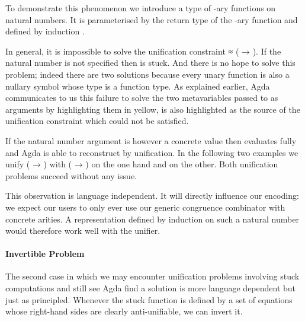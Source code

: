 To demonstrate this phenomenon we introduce a type  of -ary
functions on natural numbers. It is parameterised by the return type of the
-ary function and defined by induction .


In general, it is impossible to solve the unification constraint
{  } ≈ {( → )}. If the natural
number is not specified then  is stuck. And there is no
hope to solve this problem; indeed there are two solutions because
every unary function is also a nullary symbol whose type is a function
type. As explained earlier, Agda communicates to us this failure to solve
the two metavariables passed to  as arguments by highlighting them
in yellow,  is also highlighted as the source of the unification
constraint which could not be satisfied.


If the natural number argument is however a concrete value then 
evaluates fully and Agda is able to reconstruct  by unification. In
the following two examples we unify {( → )} with {( → )}
on the one hand and {} on the other. Both unification problems succeed
without any issue.

\begin{minipage}{0.225\textwidth}
\end{minipage}\begin{minipage}{0.225\textwidth}
\end{minipage}

This observation is language independent. It will directly influence our
encoding: we expect our users to only ever use our generic congruence
combinator with concrete arities. A representation defined by induction
on such a natural number would therefore work well with the unifier.

\paragraph{Invertible Problem}\label{sec:unifierinversion}
The second case in which we may encounter
unification problems involving stuck computations and still see Agda
find a solution is more language dependent but just as principled.
Whenever the stuck function is defined by a set of equations whose
right-hand sides are clearly anti-unifiable, we can invert it.

